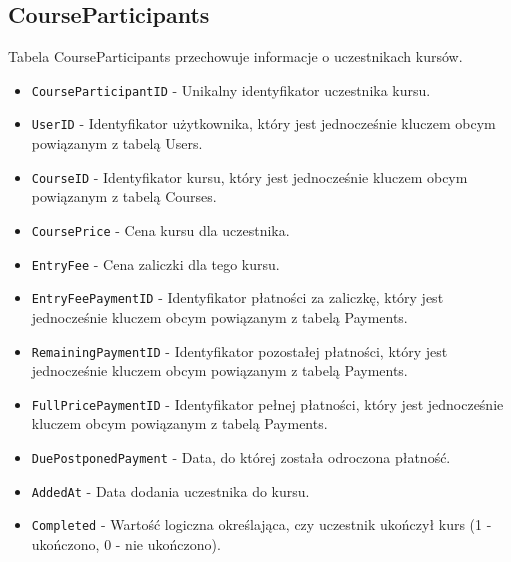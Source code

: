 \documentclass[11pt]{article}
\begin{document}
\subsection{CourseParticipants}
\label{sec:org4b83f71}
Tabela CourseParticipants przechowuje informacje o uczestnikach kursów.
\begin{itemize}
\item \texttt{CourseParticipantID} - Unikalny identyfikator uczestnika kursu.
\item \texttt{UserID} - Identyfikator użytkownika, który jest jednocześnie kluczem obcym powiązanym z tabelą Users.
\item \texttt{CourseID} - Identyfikator kursu, który jest jednocześnie kluczem obcym powiązanym z tabelą Courses.
\item \texttt{CoursePrice} - Cena kursu dla uczestnika.
\item \texttt{EntryFee} - Cena zaliczki dla tego kursu.
\item \texttt{EntryFeePaymentID} - Identyfikator płatności za zaliczkę, który jest jednocześnie kluczem obcym powiązanym z tabelą Payments.
\item \texttt{RemainingPaymentID} - Identyfikator pozostałej płatności, który jest jednocześnie kluczem obcym powiązanym z tabelą Payments.
\item \texttt{FullPricePaymentID} - Identyfikator pełnej płatności, który jest jednocześnie kluczem obcym powiązanym z tabelą Payments.
\item \texttt{DuePostponedPayment} - Data, do której została odroczona płatność.
\item \texttt{AddedAt} - Data dodania uczestnika do kursu.
\item \texttt{Completed} - Wartość logiczna określająca, czy uczestnik ukończył kurs (1 - ukończono, 0 - nie ukończono).
\end{itemize}
\end{document}
